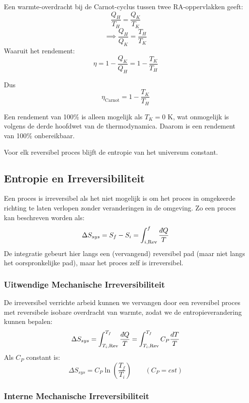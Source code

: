 Een warmte-overdracht bij de Carnot-cyclus tussen twee RA-oppervlakken geeft:
\[\frac{Q_H}{T_H} = \frac{Q_K}{T_K}\]
\[\implies \frac{Q_H}{Q_K} = \frac{T_H}{T_K}\]
Waaruit het rendement:
\[\eta = 1 - \frac{Q_K}{Q_H} = 1 - \frac{T_K}{T_H}\] 

Dus
\[
\eta_{\text{Carnot}} = 1 - \frac{T_K}{T_H}
\]

Een rendement van 100\% is alleen mogelijk als \(T_K = 0\) K, wat onmogelijk is volgens de derde hoofdwet van de thermodynamica. Daarom is een rendement van 100\% onbereikbaar.

\begin{postulate}
    Voor elk reversibel proces blijft de entropie van het universum constant. 
\end{postulate}

\subsection{Entropie en Irreversibiliteit}

\begin{definition}
    Een proces is irreversibel als het niet mogelijk is om het proces in omgekeerde richting te laten verlopen zonder veranderingen in de omgeving.
    Zo een proces kan beschreven worden als:
    \[\Delta S_{sys} = S_f-S_i = \int_{i, \text{Rev}}^{f} \frac{\dbar Q}{T}\]
    De integratie gebeurt hier langs een (vervangend) reversibel pad (maar niet langs het oorspronkelijke pad), maar het proces zelf is irreversibel.
\end{definition}

\subsubsection{Uitwendige Mechanische Irreversibiliteit}

De irreversibel verrichte arbeid kunnen we vervangen door een reversibel proces met reversibele isobare overdracht van warmte, zodat we de entropieverandering kunnen bepalen:
\[\Delta S_{sys} = \int_{T_i, \text{Rev}}^{T_f} \frac{\dbar Q}{T} = \int_{T_i, \text{Rev}}^{T_f} C_P\frac{dT}{T}\]
Als \(C_P\) constant is:
\[\Delta S_{sys} = C_P \ln \left(\frac{T_f}{T_i}\right) \qquad (C_P = cst)\]


\subsubsection{Interne Mechanische Irreversibiliteit}


